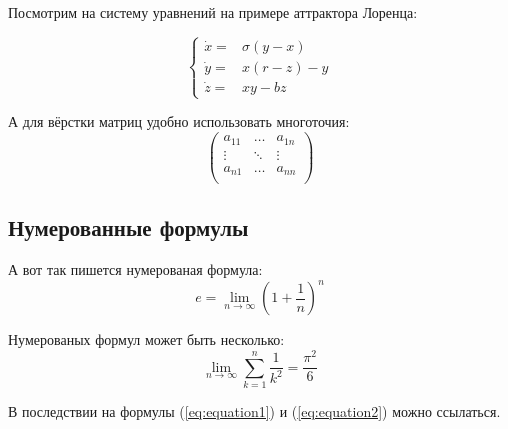 Посмотрим на систему уравнений на примере аттрактора Лоренца:

$$
\left\{
  \begin{array}{rl}
    \dot x = & \sigma (y-x) \\
    \dot y = & x (r - z) - y \\
    \dot z = & xy - bz
  \end{array}
\right.
$$

А для вёрстки матриц удобно использовать многоточия:
$$
\left(
  \begin{array}{ccc}
  	a_{11} & \ldots & a_{1n} \\
  	\vdots & \ddots & \vdots \\
  	a_{n1} & \ldots & a_{nn} \\
  \end{array}
\right)
$$


\subsection{Нумерованные формулы} \label{subsect1_3_3}

А вот так пишется нумерованая формула:
\begin{equation}
  \label{eq:equation1}
  e = \lim_{n \to \infty} \left( 1+\frac{1}{n} \right) ^n
\end{equation}

Нумерованых формул может быть несколько:
\begin{equation}
  \label{eq:equation2}
  \lim_{n \to \infty} \sum_{k=1}^n \frac{1}{k^2} = \frac{\pi^2}{6}
\end{equation}

В последствии на формулы (\ref{eq:equation1}) и (\ref{eq:equation2}) можно ссылаться.


\clearpage
